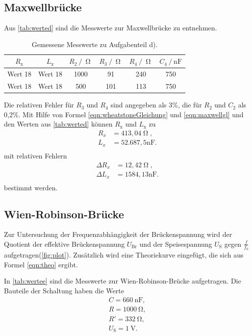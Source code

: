 \subsection{Maxwellbrücke}
Aus \autoref{tab:werted} sind die Messwerte zur Maxwellbrücke zu entnehmen.
\begin{table}[H]
  \centering
  \caption{Gemessene Messwerte zu Aufgabenteil d).}
  \label{tab:werted}
  \begin{tabular}{c c c c c c}
    \toprule
    $R_{\text{x}}$ & $L_{\text{x}}$ & $R_{\text{2}} \:/\: \upOmega$ & $R_{\text{3}} \:/\: \upOmega$ & $R_{\text{4}} \:/\: \upOmega$  & $C_{\text{4}} \:/\: \si{\nano\farad}$ \\
    \midrule
    Wert 18 & Wert 18 & 1000 & 91 & 240 & 750 \\
    Wert 18 & Wert 18 & 500 & 101 & 113 & 750 \\
    \bottomrule
  \end{tabular}
\end{table}
Die relativen Fehler für $R_3$ und $R_4$ sind angegeben als 3\%, die für $R_2$ und $C_2$ als 0,2\%. Mit Hilfe von Formel \autoref{eqn:wheatstoneGleichung} und
\autoref{eqn:maxwellgl} und den Werten aus \autoref{tab:werted} können $R_{\text{x}}$ und $L_{\text{x}}$ zu
\begin{align*}
  R_x &= 413,04 \upOmega, \\
  L_x &= 52.687,5 \si{\nano\farad} . \\
\end{align*}
mit relativen Fehlern
\begin{align*}
  \Delta R_x &= 12,42 \upOmega, \\
  \Delta L_x &= 1584,13 \si{\nano\farad} . \\
\end{align*}
bestimmt werden.


\subsection{Wien-Robinson-Brücke}
Zur Untersuchung der Frequenzabhängigkeit der Brückenspannung wird der Quotient der effektive Brückenspannung $U_{\text{Br}}$ und der Speisespannung $U_{\text{S}}$
gegen $\frac{f}{f_0}$ aufgetragen(\autoref{fig:plot}). Zusätzlich wird eine Theoriekurve eingefügt, die sich aus Formel \autoref{eqn:theo} ergibt.

In \autoref{tab:wertee} sind die Messwerte zur Wien-Robinson-Brücke aufgetragen. Die Bauteile der Schaltung haben die Werte
\begin{align*}
  C = \SI{660}{\nano\farad},\\
  R = \SI{1000}{\ohm}, \\
  R' = \SI{332}{\ohm}, \\
  U_{\text{S}} = \SI{1}{\volt}. \\
\end{align*}

